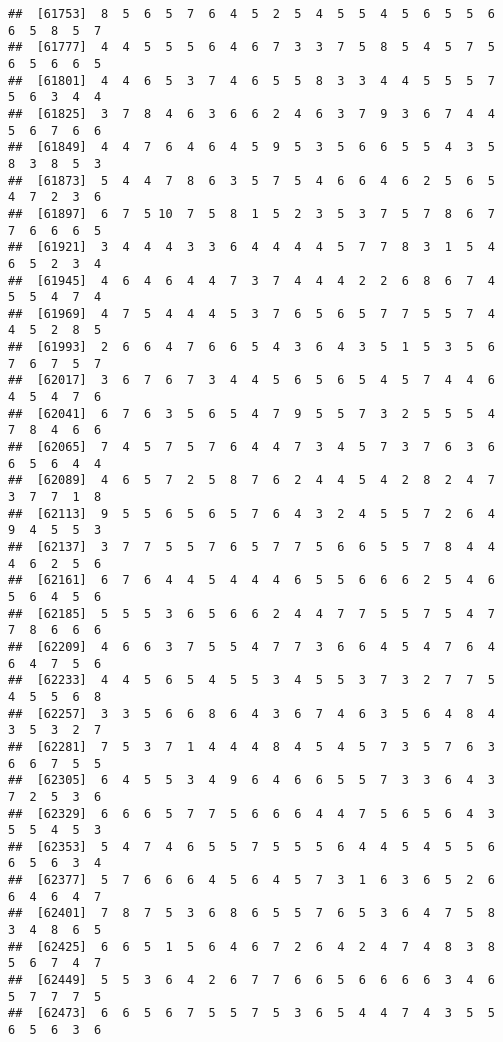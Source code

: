 \documentclass[
]{book}
\begin{document}
\begin{verbatim}
##  [61753]  8  5  6  5  7  6  4  5  2  5  4  5  5  4  5  6  5  5  6  6  5  8  5  7
##  [61777]  4  4  5  5  5  6  4  6  7  3  3  7  5  8  5  4  5  7  5  6  5  6  6  5
##  [61801]  4  4  6  5  3  7  4  6  5  5  8  3  3  4  4  5  5  5  7  5  6  3  4  4
##  [61825]  3  7  8  4  6  3  6  6  2  4  6  3  7  9  3  6  7  4  4  5  6  7  6  6
##  [61849]  4  4  7  6  4  6  4  5  9  5  3  5  6  6  5  5  4  3  5  8  3  8  5  3
##  [61873]  5  4  4  7  8  6  3  5  7  5  4  6  6  4  6  2  5  6  5  4  7  2  3  6
##  [61897]  6  7  5 10  7  5  8  1  5  2  3  5  3  7  5  7  8  6  7  7  6  6  6  5
##  [61921]  3  4  4  4  3  3  6  4  4  4  4  5  7  7  8  3  1  5  4  6  5  2  3  4
##  [61945]  4  6  4  6  4  4  7  3  7  4  4  4  2  2  6  8  6  7  4  5  5  4  7  4
##  [61969]  4  7  5  4  4  4  5  3  7  6  5  6  5  7  7  5  5  7  4  4  5  2  8  5
##  [61993]  2  6  6  4  7  6  6  5  4  3  6  4  3  5  1  5  3  5  6  7  6  7  5  7
##  [62017]  3  6  7  6  7  3  4  4  5  6  5  6  5  4  5  7  4  4  6  4  5  4  7  6
##  [62041]  6  7  6  3  5  6  5  4  7  9  5  5  7  3  2  5  5  5  4  7  8  4  6  6
##  [62065]  7  4  5  7  5  7  6  4  4  7  3  4  5  7  3  7  6  3  6  6  5  6  4  4
##  [62089]  4  6  5  7  2  5  8  7  6  2  4  4  5  4  2  8  2  4  7  3  7  7  1  8
##  [62113]  9  5  5  6  5  6  5  7  6  4  3  2  4  5  5  7  2  6  4  9  4  5  5  3
##  [62137]  3  7  7  5  5  7  6  5  7  7  5  6  6  5  5  7  8  4  4  4  6  2  5  6
##  [62161]  6  7  6  4  4  5  4  4  4  6  5  5  6  6  6  2  5  4  6  5  6  4  5  6
##  [62185]  5  5  5  3  6  5  6  6  2  4  4  7  7  5  5  7  5  4  7  7  8  6  6  6
##  [62209]  4  6  6  3  7  5  5  4  7  7  3  6  6  4  5  4  7  6  4  6  4  7  5  6
##  [62233]  4  4  5  6  5  4  5  5  3  4  5  5  3  7  3  2  7  7  5  4  5  5  6  8
##  [62257]  3  3  5  6  6  8  6  4  3  6  7  4  6  3  5  6  4  8  4  3  5  3  2  7
##  [62281]  7  5  3  7  1  4  4  4  8  4  5  4  5  7  3  5  7  6  3  6  6  7  5  5
##  [62305]  6  4  5  5  3  4  9  6  4  6  6  5  5  7  3  3  6  4  3  7  2  5  3  6
##  [62329]  6  6  6  5  7  7  5  6  6  6  4  4  7  5  6  5  6  4  3  5  5  4  5  3
##  [62353]  5  4  7  4  6  5  5  7  5  5  5  6  4  4  5  4  5  5  6  6  5  6  3  4
##  [62377]  5  7  6  6  6  4  5  6  4  5  7  3  1  6  3  6  5  2  6  6  4  6  4  7
##  [62401]  7  8  7  5  3  6  8  6  5  5  7  6  5  3  6  4  7  5  8  3  4  8  6  5
##  [62425]  6  6  5  1  5  6  4  6  7  2  6  4  2  4  7  4  8  3  8  5  6  7  4  7
##  [62449]  5  5  3  6  4  2  6  7  7  6  6  5  6  6  6  6  3  4  6  5  7  7  7  5
##  [62473]  6  6  5  6  7  5  5  7  5  3  6  5  4  4  7  4  3  5  5  6  5  6  3  6

\end{verbatim}
\end{document}
